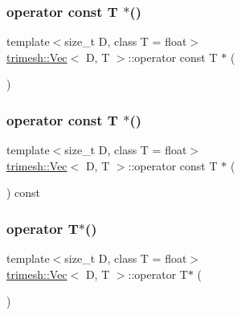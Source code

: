 \mbox{\label{classtrimesh_1_1Vec_a6fabf47f3ac24564ebc4e4276d9efbe6}} 
\subsubsection{\texorpdfstring{operator const T $\ast$()}{operator const T *()}\hspace{0.1cm}{\footnotesize\ttfamily [1/2]}}
{\footnotesize\ttfamily template$<$size\+\_\+t D, class T = float$>$ \\
\hyperlink{classtrimesh_1_1Vec}{trimesh\+::\+Vec}$<$ D, T $>$\+::operator const T $\ast$ (\begin{DoxyParamCaption}{ }\end{DoxyParamCaption})\hspace{0.3cm}{\ttfamily [inline]}}

\mbox{\label{classtrimesh_1_1Vec_a6de76a45c82e0f3fc2f9fe01c6d1fbda}} 
\subsubsection{\texorpdfstring{operator const T $\ast$()}{operator const T *()}\hspace{0.1cm}{\footnotesize\ttfamily [2/2]}}
{\footnotesize\ttfamily template$<$size\+\_\+t D, class T = float$>$ \\
\hyperlink{classtrimesh_1_1Vec}{trimesh\+::\+Vec}$<$ D, T $>$\+::operator const T $\ast$ (\begin{DoxyParamCaption}{ }\end{DoxyParamCaption}) const\hspace{0.3cm}{\ttfamily [inline]}}

\mbox{\label{classtrimesh_1_1Vec_afc09b17c31dcf8074499d415b8e8006e}} 
\subsubsection{\texorpdfstring{operator T$\ast$()}{operator T*()}}
{\footnotesize\ttfamily template$<$size\+\_\+t D, class T = float$>$ \\
\hyperlink{classtrimesh_1_1Vec}{trimesh\+::\+Vec}$<$ D, T $>$\+::operator T$\ast$ (\begin{DoxyParamCaption}{ }\end{DoxyParamCaption})\hspace{0.3cm}{\ttfamily [inline]}}

